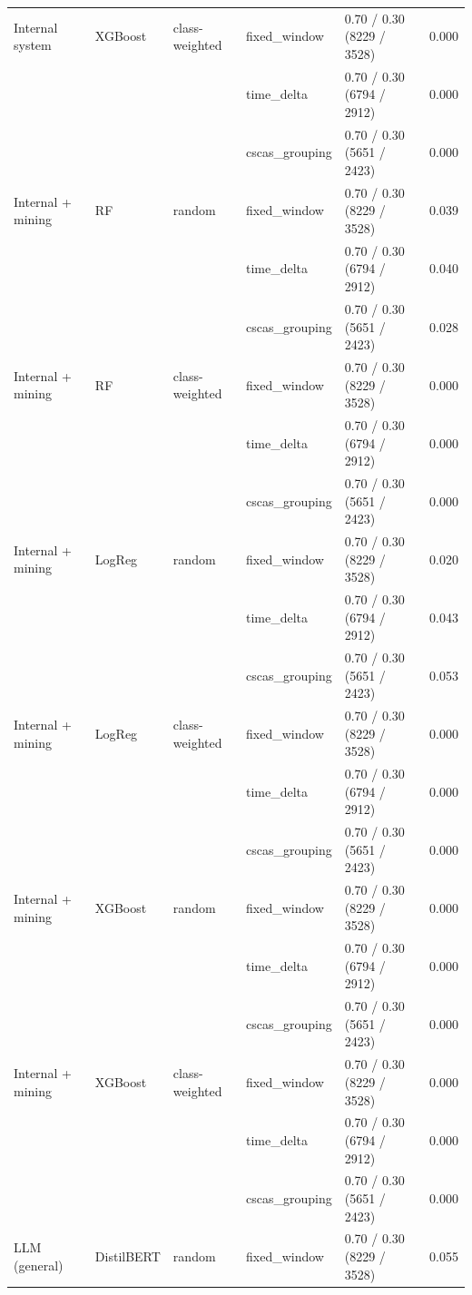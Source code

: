\begin{table}[htbp]
{\begin{tabular}{lllllc}
\addlinespace
Internal system & XGBoost & class-weighted & fixed\_window & 0.70 / 0.30 (8229 / 3528) & 0.000 \\
 &  &  & time\_delta & 0.70 / 0.30 (6794 / 2912) & 0.000 \\
 &  &  & cscas\_grouping & 0.70 / 0.30 (5651 / 2423) & 0.000 \\
\midrule
Internal + mining & RF & random & fixed\_window & 0.70 / 0.30 (8229 / 3528) & 0.039 \\
 &  &  & time\_delta & 0.70 / 0.30 (6794 / 2912) & 0.040 \\
 &  &  & cscas\_grouping & 0.70 / 0.30 (5651 / 2423) & 0.028 \\
\addlinespace
Internal + mining & RF & class-weighted & fixed\_window & 0.70 / 0.30 (8229 / 3528) & 0.000 \\
 &  &  & time\_delta & 0.70 / 0.30 (6794 / 2912) & 0.000 \\
 &  &  & cscas\_grouping & 0.70 / 0.30 (5651 / 2423) & 0.000 \\
\addlinespace
Internal + mining & LogReg & random & fixed\_window & 0.70 / 0.30 (8229 / 3528) & 0.020 \\
 &  &  & time\_delta & 0.70 / 0.30 (6794 / 2912) & 0.043 \\
 &  &  & cscas\_grouping & 0.70 / 0.30 (5651 / 2423) & 0.053 \\
\addlinespace
Internal + mining & LogReg & class-weighted & fixed\_window & 0.70 / 0.30 (8229 / 3528) & 0.000 \\
 &  &  & time\_delta & 0.70 / 0.30 (6794 / 2912) & 0.000 \\
 &  &  & cscas\_grouping & 0.70 / 0.30 (5651 / 2423) & 0.000 \\
\addlinespace
Internal + mining & XGBoost & random & fixed\_window & 0.70 / 0.30 (8229 / 3528) & 0.000 \\
 &  &  & time\_delta & 0.70 / 0.30 (6794 / 2912) & 0.000 \\
 &  &  & cscas\_grouping & 0.70 / 0.30 (5651 / 2423) & 0.000 \\
\addlinespace
Internal + mining & XGBoost & class-weighted & fixed\_window & 0.70 / 0.30 (8229 / 3528) & 0.000 \\
 &  &  & time\_delta & 0.70 / 0.30 (6794 / 2912) & 0.000 \\
 &  &  & cscas\_grouping & 0.70 / 0.30 (5651 / 2423) & 0.000 \\
\midrule
LLM (general) & DistilBERT & random & fixed\_window & 0.70 / 0.30 (8229 / 3528) & 0.055 \\

\end{tabular}}
\end{table}
